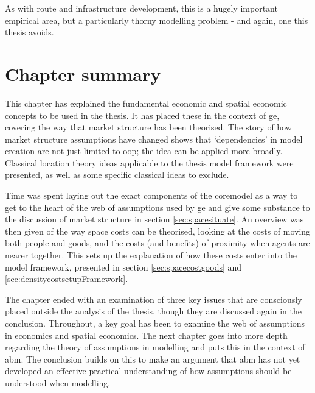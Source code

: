 {As with route and infrastructure development, this is a hugely important empirical area, but a particularly thorny modelling problem -  and again, one this thesis avoids. 


\section{Chapter summary}

This chapter has explained the fundamental economic and spatial economic concepts to be used in the thesis. It has placed these in the context of \gls{ge}, covering the way that market structure has been theorised. The story of how market structure assumptions have changed shows that `dependencies' in model creation are not just limited to \gls{oop}; the idea can be applied more broadly. Classical location theory ideas applicable to the thesis model framework were presented, as well as some specific classical ideas to exclude.

Time was spent laying out the exact components of the \gls{coremodel} as a way to get to the heart of the web of assumptions used by \gls{ge} and give some substance to the discussion of market structure in section \ref{sec:spacesituate}. An overview was then given of the way space costs can be theorised, looking at the costs of moving both people and goods, and the costs (and benefits) of proximity when agents are nearer together. This sets up the explanation of how these costs enter into the model framework, presented in section \ref{sec:spacecostgoods} and \ref{sec:densitycostsetupFramework}.

The chapter ended with an examination of three key issues that are consciously placed outside the analysis of the thesis, though they are discussed again in the conclusion. Throughout, a key goal has been to examine the web of assumptions in economics and spatial economics. The next chapter goes into more depth regarding the theory of assumptions in modelling and puts this in the context of \gls{abm}. The conclusion builds on this to make an argument that \gls{abm} has not yet developed an effective practical understanding of how assumptions should be understood when modelling.

}
